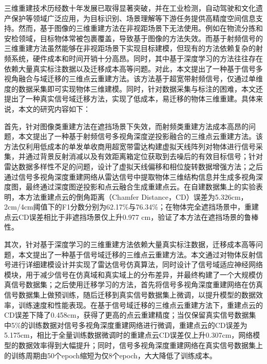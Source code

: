 
\begin{chineseabstract}
三维重建技术历经数十年发展已取得显著突破，并在工业检测，自动驾驶和文化遗产保护等领域广泛应用，为目标识别、场景理解等下游任务提供高精度空间信息支持。然而，基于图像的三维重建方法在非视距场景下无法使用。例如在物流分拣和安检领域，目标物体常被包裹覆盖，导致基于图像的方法失效。而基于射频信号的三维重建方法虽然能够在非视距场景下实现目标建模，但现有的方法依赖复杂的射频系统，硬件成本和时间开销十分高昂。同时，其中基于深度学习的方法往往存在依赖大量真实标注数据以及迁移成本高等问题。对此，本文提出了一种基于信号多视角融合与域迁移的三维点云重建方法。该方法基于超宽带射频信号，仅通过单维度的数据采集即可实现物体三维建模。同时，针对数据采集与标注的困难，本文还提出了一种真实信号域迁移方法，实现了低成本，易迁移的物体三维重建。具体来说，本文的研究内容如下：

首先，针对图像类重建方法在遮挡场景下失效，而射频类重建方法成本高昂的问题，本文提出了一种基于射频信号多视角深度逆投影融合的三维点云重建方法。该方法仅利用低成本的单发单收商用超宽带雷达构建虚拟天线阵列对物体进行信号采集，并通过背景反射消减以及有效距离箱定位获取到去噪后的有效目标信号；针对雷达数据多样性不足的问题，设计了虚拟天线偏移和相位旋转数据增强方法；之后通过信号多视角深度重建网络从雷达信号中提取物体三维结构信息并生成多视角深度图，最终通过深度图逆投影和点云融合生成重建点云。在自建数据集上的实验表明，本方法重建点云的倒角距离（Chamfer Distance，CD）误差为5.326cm，2cm/4cm阈值下的F1分数分别为62.17\%与76.34\%；在物体完全遮挡场景中，重建点云CD误差相比于非遮挡场景仅上升0.977 cm，验证了本方法在遮挡场景的鲁棒性。

其次，针对基于深度学习的三维重建方法依赖大量真实标注数据，迁移成本高等问题，本文提出了一种基于信号域迁移的三维点云重建方法。本文通过对物体反射信号进行详细建模设计并实现了雷达信号仿真算法，同时设计了信号域适应神经网络模块，用于减少信号在仿真域和真实域上的分布差异，并最终构建了一个大规模仿真信号数据集；之后使用迁移学习的方法，首先将信号多视角深度重建网络在仿真信号数据集上做预训练，随后迁移到真实信号数据集上微调，以提升模型的数据效率，训练速度和性能表现。在基于信号域迁移的三维点云重建方法下，重建点云的CD误差下降了0.458cm，获得了更高的点云重建精度；当仅保留真实信号数据集中5\%的训练数据对信号多视角深度重建网络进行微调，重建点云的CD误差为5.175cm，相比于全量训练数据微调时的重建点云CD误差仅上升0.307cm，网络模型的数据效率得到大幅提升；同时，信号多视角深度重建网络在真实信号数据集上的训练周期由50个epoch缩短为仅8个epoch，大大降低了训练成本。



\end{chineseabstract}

